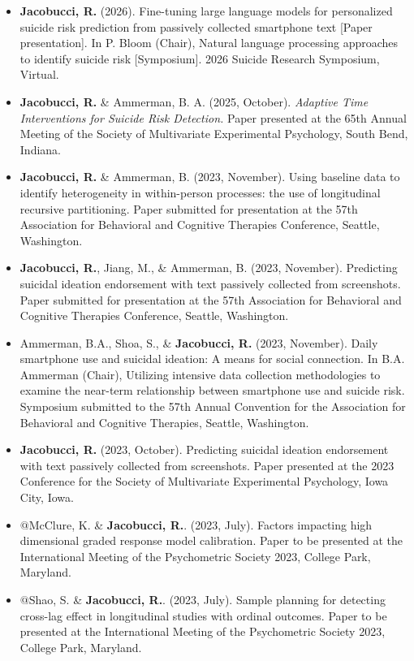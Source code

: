 \documentclass[letterpaper,10pt]{article}
\begin{document}
\begin{itemize}
	\item[] \textbf{Jacobucci, R. }(2026). Fine-tuning large language models for personalized suicide risk prediction from passively collected smartphone text [Paper presentation]. In P. Bloom (Chair), Natural language processing approaches to identify suicide risk [Symposium]. 2026 Suicide Research Symposium, Virtual.
	\item[] \textbf{Jacobucci, R.} \& Ammerman, B. A. (2025, October). \emph{Adaptive Time Interventions for Suicide Risk Detection.} Paper presented at the 65th Annual Meeting of the Society of Multivariate Experimental Psychology, South Bend, Indiana.
	\item[] \textbf{Jacobucci, R.} \& Ammerman, B. (2023, November). Using baseline data to identify heterogeneity in within-person processes: the use of longitudinal recursive partitioning. Paper submitted for presentation at the 57th Association for Behavioral and Cognitive Therapies Conference, Seattle, Washington.
	\item[] \textbf{Jacobucci, R.}, Jiang, M., \& Ammerman, B. (2023, November). Predicting suicidal ideation endorsement with text passively collected from screenshots. Paper submitted for presentation at the 57th Association for Behavioral and Cognitive Therapies Conference, Seattle, Washington.
	\item[] Ammerman, B.A., Shoa, S., \& \textbf{Jacobucci, R.} (2023, November). Daily smartphone use and suicidal ideation: A means for social connection. In B.A. Ammerman (Chair), Utilizing intensive data collection methodologies to examine the near-term relationship between smartphone use and suicide risk.  Symposium submitted to the 57th Annual Convention for the Association for Behavioral and Cognitive Therapies, Seattle, Washington.
		\item[] \textbf{Jacobucci, R.} (2023, October). Predicting suicidal ideation endorsement with text passively collected from screenshots. Paper presented at the 2023 Conference for the Society of Multivariate Experimental Psychology, Iowa City, Iowa. 
	\item[] $@$McClure, K. \& \textbf{Jacobucci, R.}. (2023, July). Factors impacting high dimensional graded response model calibration. Paper to be presented at the International Meeting of the Psychometric Society 2023, College Park, Maryland.
	\item[] $@$Shao, S. \& \textbf{Jacobucci, R.}. (2023, July). Sample planning for detecting cross-lag effect in longitudinal studies with ordinal outcomes. Paper to be presented at the International Meeting of the Psychometric Society 2023, College Park, Maryland.

\end{itemize}
\end{document}
